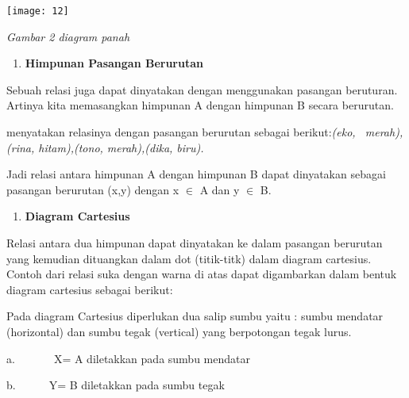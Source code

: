 \documentclass[11pt,fleqn]{book} %
\begin{document}
\begin{center}
\noindent \texttt{[image: 12]}
\end{center}

\noindent \textit{Gambar 2 diagram panah}

\noindent \textit{}

\begin{enumerate}
\item \textit{ }\textbf{Himpunan Pasangan Berurutan}
\end{enumerate}

\noindent 

\noindent Sebuah relasi juga dapat dinyatakan dengan menggunakan pasangan beruturan. Artinya kita memasangkan himpunan A dengan himpunan B secara berurutan.

\noindent 

\noindent 

\noindent 

\noindent 

\noindent 

\noindent 

\noindent 

\noindent menyatakan relasinya dengan pasangan berurutan sebagai berikut:\textit{(eko, ~merah), (rina, hitam),(tono, merah),(dika, biru).}

\noindent Jadi relasi antara himpunan A dengan himpunan B dapat dinyatakan sebagai pasangan berurutan (x,y) dengan x $\mathrm{\in }$ A dan y $\mathrm{\in }$ B.

\noindent 

\begin{enumerate}
\item  \textbf{Diagram Cartesius}
\end{enumerate}

\noindent Relasi antara dua himpunan dapat dinyatakan ke dalam pasangan berurutan yang kemudian dituangkan dalam dot (titik-titk) dalam diagram cartesius. Contoh dari relasi suka dengan warna di atas dapat digambarkan dalam bentuk diagram cartesius sebagai berikut:

\noindent Pada diagram Cartesius diperlukan dua salip sumbu yaitu : sumbu mendatar (horizontal) dan sumbu tegak (vertical) yang berpotongan tegak lurus.

\noindent a.~~~~~~~X= A diletakkan pada sumbu mendatar

\noindent b.~~~~~~Y= B diletakkan pada sumbu tegak
\end{document}

